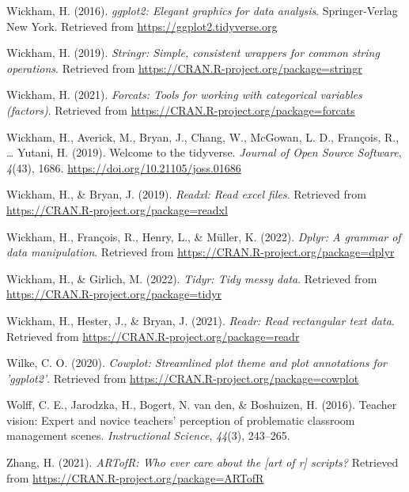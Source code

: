 \documentclass[
  man,floatsintext]{apa6}
\newlength{\cslhangindent}
\newlength{\cslentryspacingunit} %
\newenvironment{CSLReferences}[2] %
 {%
  \setlength{\parindent}{0pt}
  \ifodd #1
  \let\oldpar\par
  \def\par{\hangindent=\cslhangindent\oldpar}
  \fi
  \setlength{\parskip}{#2\cslentryspacingunit}
 }%
 {}
\begin{document}
\begin{CSLReferences}{1}{0}
\leavevmode{}%
Wickham, H. (2016). \emph{ggplot2: Elegant graphics for data analysis}. Springer-Verlag New York. Retrieved from \url{https://ggplot2.tidyverse.org}

\leavevmode{}%
Wickham, H. (2019). \emph{Stringr: Simple, consistent wrappers for common string operations}. Retrieved from \url{https://CRAN.R-project.org/package=stringr}

\leavevmode{}%
Wickham, H. (2021). \emph{Forcats: Tools for working with categorical variables (factors)}. Retrieved from \url{https://CRAN.R-project.org/package=forcats}

\leavevmode{}%
Wickham, H., Averick, M., Bryan, J., Chang, W., McGowan, L. D., François, R., \ldots{} Yutani, H. (2019). Welcome to the {tidyverse}. \emph{Journal of Open Source Software}, \emph{4}(43), 1686. \url{https://doi.org/10.21105/joss.01686}

\leavevmode{}%
Wickham, H., \& Bryan, J. (2019). \emph{Readxl: Read excel files}. Retrieved from \url{https://CRAN.R-project.org/package=readxl}

\leavevmode{}%
Wickham, H., François, R., Henry, L., \& Müller, K. (2022). \emph{Dplyr: A grammar of data manipulation}. Retrieved from \url{https://CRAN.R-project.org/package=dplyr}

\leavevmode{}%
Wickham, H., \& Girlich, M. (2022). \emph{Tidyr: Tidy messy data}. Retrieved from \url{https://CRAN.R-project.org/package=tidyr}

\leavevmode{}%
Wickham, H., Hester, J., \& Bryan, J. (2021). \emph{Readr: Read rectangular text data}. Retrieved from \url{https://CRAN.R-project.org/package=readr}

\leavevmode{}%
Wilke, C. O. (2020). \emph{Cowplot: Streamlined plot theme and plot annotations for 'ggplot2'}. Retrieved from \url{https://CRAN.R-project.org/package=cowplot}

\leavevmode{}%
Wolff, C. E., Jarodzka, H., Bogert, N. van den, \& Boshuizen, H. (2016). Teacher vision: Expert and novice teachers' perception of problematic classroom management scenes. \emph{Instructional Science}, \emph{44}(3), 243--265.

\leavevmode{}%
Zhang, H. (2021). \emph{ARTofR: Who ever care about the {[}art of r{]} scripts?} Retrieved from \url{https://CRAN.R-project.org/package=ARTofR}

\end{CSLReferences}

\endgroup


\clearpage
\renewcommand{\listfigurename}{Figure captions}

\clearpage
\renewcommand{\listtablename}{Table captions}
\end{document}
